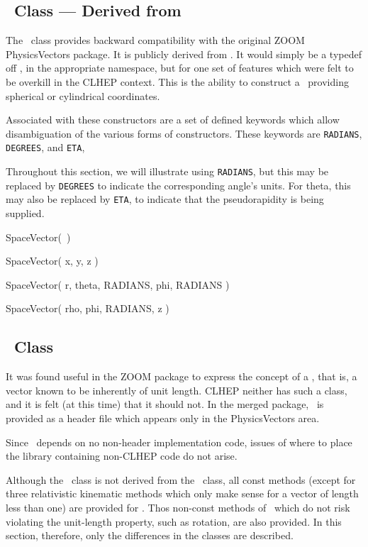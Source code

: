 \subsection{\protect\SVz\ Class --- Derived from \SV }

The \SVz\ class provides backward compatibility with the original ZOOM
PhysicsVectors package.  
It is publicly derived from \SV .
It would simply be a typedef off \SV , in the appropriate namespace, 
but for one set of features which were felt to be overkill in the 
CLHEP context.  
This is the ability to construct a \SVz\ providing spherical or cylindrical
coordinates.  

Associated with these constructors are a set of defined keywords which
allow disambiguation of the various forms of constructors.  
These keywords are {\tt RADIANS}, {\tt DEGREES}, and {\tt ETA}, 

Throughout this section, we will illustrate using {\tt RADIANS}, 
but this may be replaced by {\tt DEGREES}
to indicate the corresponding angle's units.
For theta, this may also be replaced by {\tt ETA}, to indicate that the
pseudorapidity is being supplied.

\begin{shortlist}
  \item SpaceVector(~)
  \item SpaceVector( x, y, z ) 
  \item SpaceVector( r, theta, RADIANS, phi, RADIANS ) \see{\ref{eq:polar}}
  \item SpaceVector( rho, phi, RADIANS, z ) \see{\ref{eq:cylindrical}}
\end{shortlist}


\subsection{\protect\UV\ Class}

It was found useful in the ZOOM package to express the concept of a 
\UV, that is, a vector known to be inherently of unit length.
CLHEP neither has such a class, and it is felt (at this time) that
it should not.  
In the merged package, 
\UV\ is provided as a header file which appears only in the PhysicsVectors 
area.  

Since \UV\ depends on no non-header implementation code, issues of where
to place the library containing non-CLHEP code do not arise.

Although the \UV\ class is not derived from the \SVz\ class,
all const methods (except for three relativistic kinematic methods
which only make sense for a vector of length less than one) 
are provided for \UV .
Thos non-const methods of \SV\ which do not risk violating the unit-length 
property, such as rotation, are also provided.  
In this section, therefore,
only the differences in the classes are described.

